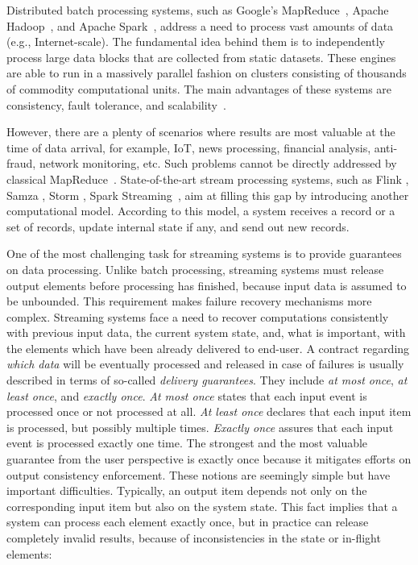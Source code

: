 
\label {fs-intro-seciton}

Distributed batch processing systems, such as Google's MapReduce~\cite{Dean:2008:MSD:1327452.1327492}, Apache Hadoop~\cite{hadoop2009hadoop}, and Apache Spark~\cite{Zaharia:2016:ASU:3013530.2934664}, address a need to process vast amounts of data (e.g., Internet-scale). The fundamental idea behind them is to independently process large data blocks that are collected from static datasets. These engines are able to run in a massively parallel fashion on clusters consisting of thousands of commodity computational units. The main advantages of these systems are consistency, fault tolerance, and scalability~\cite{borthakur2011apache}.

However, there are a plenty of scenarios where results are most valuable at the time of data arrival, for example, IoT, news processing, financial analysis, anti-fraud, network monitoring, etc. Such problems cannot be directly addressed by classical MapReduce~\cite{Doulkeridis:2014:SLA:2628707.2628782}. State-of-the-art stream processing systems, such as Flink \cite{carbone2015apache}, Samza \cite{Noghabi:2017:SSS:3137765.3137770}, Storm \cite{apache:storm}, Spark Streaming~\cite{Zaharia:2012:DSE:2342763.2342773}, aim at filling this gap by introducing another computational model. According to this model, a system receives a record or a set of records, update internal state if any, and send out new records. 

One of the most challenging task for streaming systems is to provide guarantees on data processing. Unlike batch processing, streaming systems must release output elements before processing has finished, because input data is assumed to be unbounded. This requirement makes failure recovery mechanisms more complex. Streaming systems face a need to recover computations consistently with previous input data, the current system state, and, what is important, with the elements which have been already delivered to end-user. A contract regarding {\em which data} will be eventually processed and released in case of failures is usually described in terms of so-called {\em delivery guarantees}. They include {\em at most once}, {\em at least once}, and {\em exactly once}. {\it At most once} states that each input event is processed once or not processed at all. {\it At least once} declares that each input item is processed, but possibly multiple times. {\it Exactly once} assures that each input event is processed exactly one time. The strongest and the most valuable guarantee from the user perspective is exactly once because it mitigates efforts on output consistency enforcement. These notions are seemingly simple but have important difficulties. Typically, an output item depends not only on the corresponding input item but also on the system state. This fact implies that a system can process each element exactly once, but in practice can release completely invalid results, because of inconsistencies in the state or in-flight elements:

